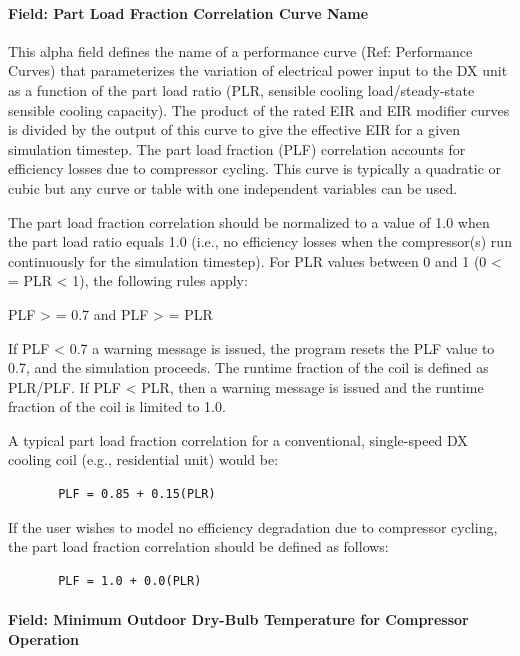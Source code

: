 \paragraph{Field: Part Load Fraction Correlation Curve Name}\label{field-part-load-fraction-correlation-curve-name-2}

This alpha field defines the name of a performance curve (Ref: Performance Curves) that parameterizes the variation of electrical power input to the DX unit as a function of the part load ratio (PLR, sensible cooling load/steady-state sensible cooling capacity). The product of the rated EIR and EIR modifier curves is divided by the output of this curve to give the effective EIR for a given simulation timestep. The part load fraction (PLF) correlation accounts for efficiency losses due to compressor cycling. This curve is typically a quadratic or cubic but any curve or table with one independent variables can be used.

The part load fraction correlation should be normalized to a value of 1.0 when the part load ratio equals 1.0 (i.e., no efficiency losses when the compressor(s) run continuously for the simulation timestep). For PLR values between 0 and 1 (0 \textless{} = PLR \textless{} 1), the following rules apply:

PLF \textgreater{} = 0.7 and PLF \textgreater{} = PLR

If PLF \textless{} 0.7 a warning message is issued, the program resets the PLF value to 0.7, and the simulation proceeds. The runtime fraction of the coil is defined as PLR/PLF. If PLF \textless{} PLR, then a warning message is issued and the runtime fraction of the coil is limited to 1.0.

A typical part load fraction correlation for a conventional, single-speed DX cooling coil (e.g., residential unit) would be:

\begin{lstlisting}
       PLF = 0.85 + 0.15(PLR)
\end{lstlisting}

If the user wishes to model no efficiency degradation due to compressor cycling, the part load fraction correlation should be defined as follows:

\begin{lstlisting}
       PLF = 1.0 + 0.0(PLR)
\end{lstlisting}

\paragraph{Field: Minimum Outdoor Dry-Bulb Temperature for Compressor Operation}\label{field-minimum-outdoor-dry-bulb-temperature-for-compressor-operation}

